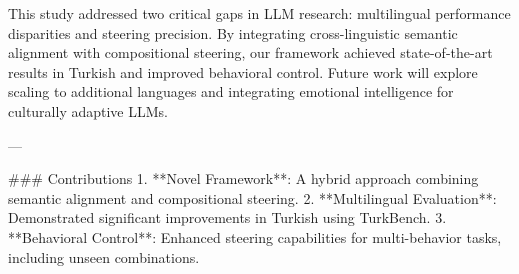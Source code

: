 This study addressed two critical gaps in LLM research: multilingual performance disparities and steering precision. By integrating cross-linguistic semantic alignment with compositional steering, our framework achieved state-of-the-art results in Turkish and improved behavioral control. Future work will explore scaling to additional languages and integrating emotional intelligence for culturally adaptive LLMs.  

---

### Contributions  
1. **Novel Framework**: A hybrid approach combining semantic alignment and compositional steering.  
2. **Multilingual Evaluation**: Demonstrated significant improvements in Turkish using TurkBench.  
3. **Behavioral Control**: Enhanced steering capabilities for multi-behavior tasks, including unseen combinations.  

